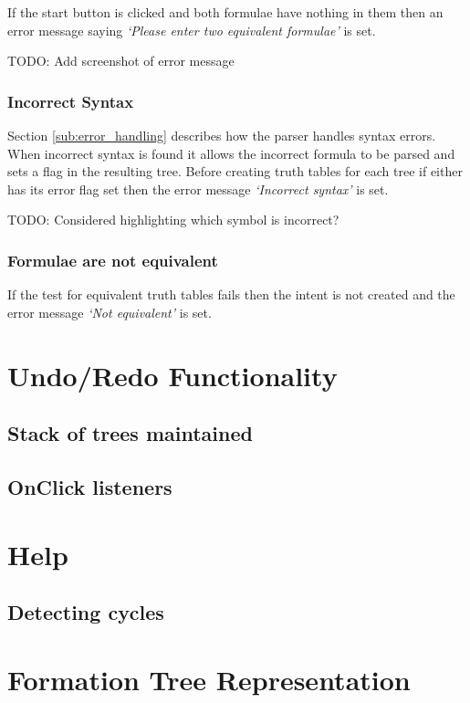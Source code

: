 \documentclass{report}
\begin{document}
If the start button is clicked and both formulae have nothing in them then an error message saying \textit{`Please enter two equivalent formulae'} is set.

TODO: Add screenshot of error message

\subsubsection{Incorrect Syntax}

Section \ref{sub:error_handling} describes how the parser handles syntax errors. When incorrect syntax is found it allows the incorrect formula to be parsed and sets a flag in the resulting tree. Before creating truth tables for each tree if either has its error flag set then the error message \textit{`Incorrect syntax'} is set.

TODO: Considered highlighting which symbol is incorrect?

\subsubsection{Formulae are not equivalent}

If the test for equivalent truth tables fails then the intent is not created and the error message \textit{`Not equivalent'} is set.

\section{Undo/Redo Functionality}
\label{sec:undo_redo}

\subsection{Stack of trees maintained}
\subsection{OnClick listeners}

\section{Help}
\subsection{Detecting cycles}
\label{sub:detecting_cycles}

\section{Formation Tree Representation}
\label{sec:formation_tree_representation}
\end{document}
